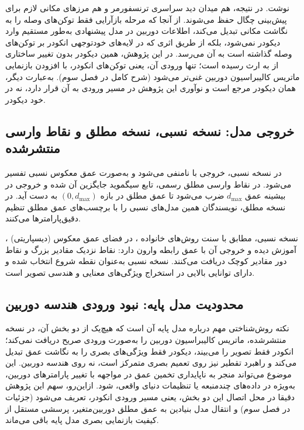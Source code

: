 نوشت. در نتیجه، هم میدان دید سراسری ترنسفورمر و هم مرزهای مکانی لازم برای پیش‌بینی چگال حفظ می‌شوند. از آنجا که مرحله بازآرایی فقط توکن‌های وصله را به نگاشت مکانی تبدیل می‌کند، اطلاعات دوربین در مدل پیشنهادی به‌طور مستقیم وارد دیکودر نمی‌شود، بلکه از طریق اثری که در لایه‌های خودتوجهی انکودر بر توکن‌های وصله گذاشته است به آن می‌رسد. در این پژوهش، همین دیکودر بدون تغییر ساختاری از  به ارث رسیده است؛ تنها ورودی آن، یعنی توکن‌های انکودر، با افزودن بازنمایی ماتریس کالیبراسیون دوربین غنی‌تر می‌شود (شرح کامل در فصل سوم). به‌عبارت دیگر،  همان دیکودر مرجع است و نوآوری این پژوهش در مسیر ورودی به آن قرار دارد، نه در خود دیکودر.
\subsection[خروجی مدل: نسخه نسبی، نسخه مطلق و نقاط وارسی منتشرشده]{خروجی مدل: نسخه نسبی، نسخه مطلق و نقاط وارسی منتشرشده}
\label{subsec:ch2_base_output}
در نسخه نسبی، خروجی با {} نامنفی می‌شود و به‌صورت عمق معکوس نسبی تفسیر می‌شود. در نقاط وارسی مطلق رسمی، تابع سیگموید جایگزین آن شده و خروجی در بیشینه عمق {$d_{\max}$} ضرب می‌شود تا عمق مطلق در بازه {$(0,d_{\max})$} به دست آید. در نسخه مطلق، نویسندگان همین مدل‌های نسبی را با برچسب‌های عمق مطلق تنظیم دقیق‌پارامترها می‌کنند.

{\basemodel{}}، نسخه نسبی، مطابق با سنت روش‌های خانواده {} {\cite{Ranftl2019Robust}}، در فضای عمق معکوس (دیسپاریتی) آموزش دیده و خروجی آن با عمق رابطه وارون دارد: نقاط نزدیک مقادیر بزرگ و نقاط دور مقادیر کوچک دریافت می‌کنند. نسخه نسبی {\basemodel{}} به‌عنوان نقطه شروع انتخاب شده و دارای توانایی بالایی در استخراج ویژگی‌های معنایی و هندسی تصویر است.

\subsection[محدودیت مدل پایه: نبود ورودی هندسه دوربین]{محدودیت مدل پایه: نبود ورودی هندسه دوربین}
نکته روش‌شناختی مهم درباره مدل پایه آن است که هیچ‌یک از دو بخش آن، در نسخه منتشرشده، ماتریس کالیبراسیون دوربین را به‌صورت ورودی صریح دریافت نمی‌کند؛ انکودر  فقط تصویر را می‌بیند، دیکودر  فقط ویژگی‌های بصری را به نگاشت عمق تبدیل می‌کند و راهبرد تقطیر  نیز روی تعمیم بصری متمرکز است، نه روی هندسه دوربین. این موضوع می‌تواند منجر به ناپایداری تخمین عمق در مواجهه با تغییر پارامترهای دوربین، به‌ویژه در داده‌های چندمنبعه یا تنظیمات دنیای واقعی، شود. ازاین‌رو، سهم این پژوهش دقیقا در محل اتصال این دو بخش، یعنی مسیر ورودی انکودر، تعریف می‌شود (جزئیات در فصل سوم) و انتقال مدل بنیادین به عمق مطلق دوربین‌متغیر، پرسشی مستقل از کیفیت بازنمایی بصری مدل پایه باقی می‌ماند.

